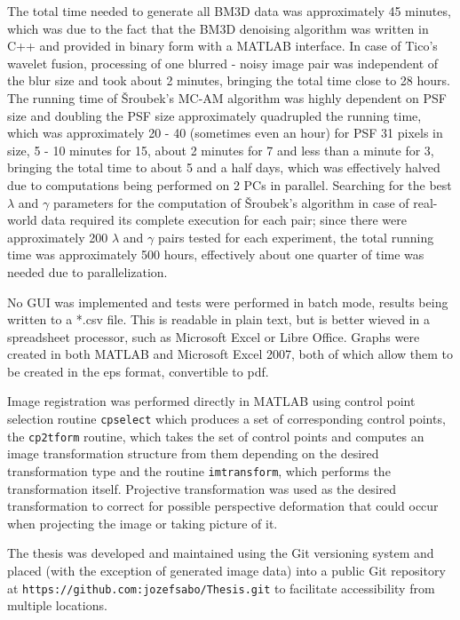 \documentclass[12pt,notitlepage]{report}
\begin{document}
The total time needed to generate all BM3D data was approximately 45 minutes, which was due to the fact that the BM3D denoising algorithm was written in C++ and provided in binary form with a MATLAB interface. In case of Tico's wavelet fusion, processing of one blurred - noisy image pair was independent of the blur size and took about 2 minutes, bringing the total time close to 28 hours. The running time of Šroubek's MC-AM algorithm was highly dependent on PSF size and doubling the PSF size approximately quadrupled the running time, which was approximately 20 - 40 (sometimes even an hour) for PSF 31 pixels in size, 5 - 10 minutes for 15, about 2 minutes for 7 and less than a minute for 3, bringing the total time to about 5 and a half days, which was effectively halved due to computations being performed on 2 PCs in parallel. Searching for the best $\lambda$ and $\gamma$ parameters for the computation of Šroubek's algorithm in case of real-world data required its complete execution for each pair; since there were approximately 200 $\lambda$ and $\gamma$ pairs tested for each experiment, the total running time was approximately 500 hours, effectively about one quarter of time was needed due to parallelization.  

No GUI was implemented and tests were performed in batch mode, results being written to a *.csv file. This is readable in plain text, but is better wieved in a spreadsheet processor, such as Microsoft Excel or Libre Office. Graphs were created in both MATLAB and Microsoft Excel 2007, both of which allow them to be created in the eps format, convertible to pdf. 

Image registration was performed directly in MATLAB using control point selection routine \texttt{cpselect} which produces a set of corresponding control points, the \texttt{cp2tform} routine, which takes the set of control points and computes an image transformation structure from them depending on the desired transformation type and the routine \texttt{imtransform}, which performs the transformation itself. Projective transformation was used as the desired transformation to correct for possible perspective deformation that could occur when projecting the image or taking picture of it.  

The thesis was developed and maintained using the Git versioning system and placed (with the exception of generated image data) into a public Git repository at \texttt{https://github.com:jozefsabo/Thesis.git} to facilitate accessibility from multiple locations.
\end{document}
